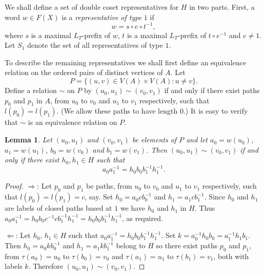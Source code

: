 \documentclass[a4paper,12pt]{article}
\def\t{\tau }
\newtheorem{lemma}[theorem]{Lemma}
\numberwithin{equation}{section}
\numberwithin{figure}{section}
\begin{document}
We shall define a set of double coset representatives for $H$ in two parts. 
First, a word $w\in F(X)$ is a {\em representative of type} $1$ if 
\[w=s\circ e \circ t^{-1},\]
where $s$ is a maximal $L_T$-prefix of $w$, $t$ is a maximal $L_T$-prefix of 
$t\circ e^{-1}$ and $e\neq 1$. Let $S_1$ denote the set of all representatives of 
type $1$. 

To describe the remaining representatives we shall first define an equivalence
relation on the ordered pairs of distinct vertices of $A$. Let
\[P=\{(u,v)\in V(A)\times V(A): u\neq v\}.\]
Define a relation $\sim$ on $P$ by $(u_0,u_1)\sim (v_0,v_1)$ if and only if 
there exist paths $p_0$ and $p_1$ in $A$, from $u_0$ to $v_0$ and $u_1$ to $v_1$ 
respectively, such that $l(p_0)=l(p_1)$. (We allow these paths to have length $0$.)
It is easy to verify that $\sim$ is an equivalence relation on $P$. 

\begin{lemma}\label{lem:equiv_verts}
Let $(u_0,u_1)$ and $(v_0,v_1)$ be elements of $P$ and let 
$a_0=w(u_0)$, $a_1=w(u_1)$, $b_0=w(v_0)$ and $b_1=w(v_1)$. Then 
$(u_0,u_1)\sim (v_0,v_1)$ if and only if there exist $h_0,h_1\in H$ such that
\[a_0a_1^{-1}=h_0b_0b_1^{-1}h_1^{-1}.\]
\end{lemma}  
\begin{proof}
$\Rightarrow$: Let $p_0$ and $p_1$ be paths, from $u_0$ to $v_0$ and $u_1$ to $v_1$ 
respectively, such that $l(p_0)=l(p_1)=c$, say. Set $h_0=a_0cb_0^{-1}$ and 
$h_1=a_1cb_1^{-1}$. Since $h_0$ and $h_1$ are labels of closed paths based at $1$ we
have $h_0$ and $h_1$ in $H$. Thus 
$a_0a_1^{-1}=h_0b_0c^{-1}cb_1^{-1}h_1^{-1}=h_0b_0b_1^{-1}h_1^{-1}$, as required.

$\Leftarrow$: Let $h_0$, $h_1 \in H$ such that $a_0a_1^{-1}=h_0b_0b_1^{-1}h_1^{-1}$. 
Set $k=a_0^{-1}h_0b_0=a_1^{-1}h_1b_1$. Then $h_0=a_0kb_0^{-1}$ and $h_1=a_1kb_1^{-1}$
belong to $H$ so there exist paths $p_0$ and $p_1$, 
from $\t(a_0)=u_0$ to $\t(b_0)=v_0$ and 
$\t(a_1)=u_1$ to $\t(b_1)=v_1$, both with labels $k$. 
Therefore $(u_0,u_1)\sim (v_0,v_1)$. 
\end{proof}  
\end{document}
